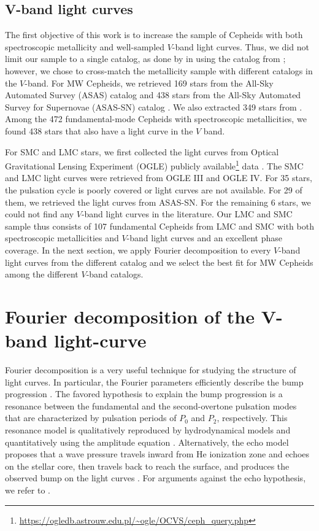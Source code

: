 \documentclass[article]{aa} %
\begin{document}
\subsection{V-band light curves}\label{sect:data_set_V}
The first objective of this work is to increase the sample of Cepheids with both spectroscopic metallicity and well-sampled $V$-band light curves. Thus, we did not limit our sample to a single catalog, as done by \cite{Klagyivik2013} in using the catalog from \cite{Berdnikov2008}; however, we chose to cross-match the metallicity sample with different catalogs in the $V$-band. For MW Cepheids, we retrieved 169 stars from the All-Sky Automated Survey (ASAS) catalog \citep{Pojmanski2002} and 438 stars from the All-Sky Automated Survey for Supernovae (ASAS-SN) catalog  \citep{ASAS2018}. We also extracted 349 stars from \cite{Berdnikov2008}. Among the 472 fundamental-mode Cepheids with spectroscopic metallicities, we found 438 stars that also have a light curve in the $V$ band.




For SMC and LMC stars, we first collected the light curves from Optical Gravitational Lensing Experiment (OGLE) publicly available\footnote{\url{https://ogledb.astrouw.edu.pl/~ogle/OCVS/ceph_query.php}} data \citep{Soszynski2008,Soszynski2010}. The SMC and LMC light curves were retrieved from OGLE III and OGLE IV. For 35 stars, the pulsation cycle is poorly covered or light curves are not available. For 29 of them, we retrieved the light curves from ASAS-SN. For the remaining 6 stars, we could not find any $V$-band light curves in the literature. 
Our LMC and SMC sample thus consists of 107 fundamental Cepheids from LMC and SMC with both spectroscopic metallicities and $V$-band light curves and an excellent phase coverage. In the next section, we apply Fourier decomposition to every $V$-band light curves from the different catalog and we select the best fit for MW Cepheids among the different $V$-band catalogs.






\section{Fourier decomposition of the V-band light-curve}\label{sect:fourier}
 Fourier decomposition is a very useful technique for studying the structure of light curves. In particular, the Fourier parameters efficiently describe  the bump progression \citep{Hertzsprung1926}. The favored hypothesis to explain the bump progression is a resonance  between the fundamental and the second-overtone pulsation modes \citep{SimonSchmidt1976} that are characterized by pulsation periods of $P_0$ and $P_2$, respectively. This resonance model is qualitatively reproduced by hydrodynamical models \citep{Buchler1990} and quantitatively using the amplitude equation \citep{kovacs1989}. Alternatively, the echo model proposes that a wave pressure travels inward from He ionization zone and echoes on the stellar core, then travels back to reach the surface, and produces the observed bump on the light curves \citep{Whitney1956,christy68,Christy1975}. For arguments against the echo hypothesis, we refer to \cite{Klapp1985}.
 
\end{document}
